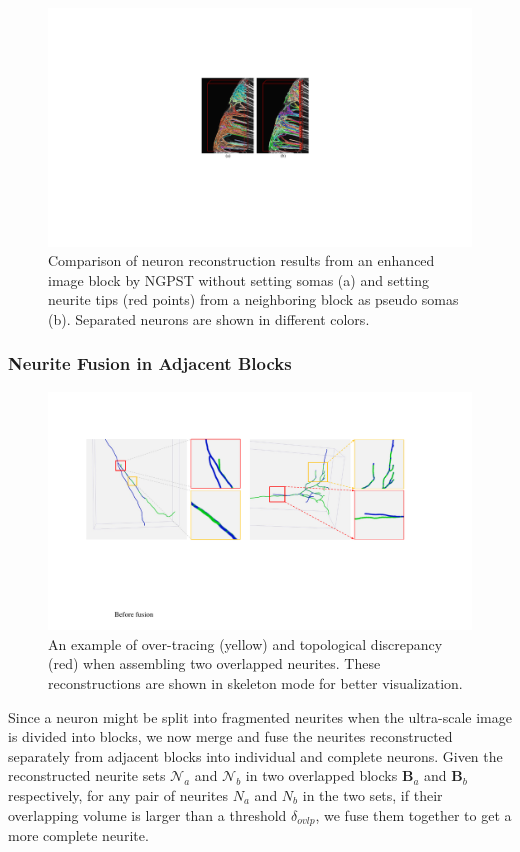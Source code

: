 \begin{figure}[t]
	\centering
	\includegraphics[width=0.85\columnwidth]{./Illustrations/ngpst_pseudosoma.pdf}
	\caption{Comparison of neuron reconstruction results from an enhanced image block by NGPST without setting somas (a) and setting neurite tips (red points) from a neighboring block as pseudo somas (b). Separated neurons are shown in different colors.}
	\label{fig:ngpst_pseudosoma}
\end{figure}



\subsubsection{Neurite Fusion in Adjacent Blocks}
\label{sec:fusion}


\begin{figure}[t]
	\centering
	\includegraphics[width=0.86\columnwidth]{./Illustrations/fusion_errors.pdf}
	\caption{An example of over-tracing (yellow) and topological discrepancy (red) when assembling two overlapped neurites. These reconstructions are shown in skeleton mode for better visualization.}
	\label{fig:overlap_discrepancy}
\end{figure}
Since a neuron might be split into fragmented neurites when the ultra-scale image is divided into blocks, we now merge and fuse the neurites reconstructed separately from adjacent blocks into individual and complete neurons.
Given the reconstructed neurite sets $\mathcal{N}_a$ and $\mathcal{N}_b$ in two overlapped blocks $\mathbf{B}_a$ and $\mathbf{B}_b$ respectively, for any pair of neurites $N_a$ and $N_b$ in the two sets, if their overlapping volume is larger than a threshold $\delta_{ovlp}$, we fuse them together to get a more complete neurite.

